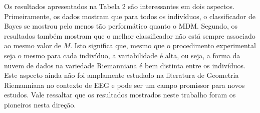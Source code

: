 \documentclass[a4paper,titlepage]{article}
\begin{document}
\begin{center}
  \vspace{1em}
  \vspace{1em}
\end{center}

Os resultados apresentados na Tabela 2 são interessantes em dois aspectos.
Primeiramente, os dados mostram que para todos os indivíduos, o classificador de
Bayes se mostrou pelo menos tão performático quanto o MDM\@. Segundo, os
resultados também mostram que o melhor classificador não está sempre associado
ao mesmo valor de $M$. Isto significa que, mesmo que o procedimento experimental
seja o mesmo para cada indivíduo, a variabilidade é alta, ou seja, a forma da
nuvem de dados na variedade Riemanniana é bem distinta entre os indivíduos.
Este aspecto ainda não foi amplamente estudado na literatura de Geometria
Riemanniana no contexto de EEG e pode ser um campo promissor para novos
estudos. Vale ressaltar que os resultados mostrados neste trabalho foram os
pioneiros nesta direção.

\begin{center}
  \vspace{1em}
  \vspace{1em}
\end{center}
\end{document}
